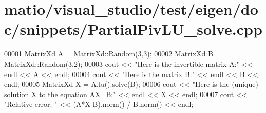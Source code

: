 \hypertarget{matio_2visual__studio_2test_2eigen_2doc_2snippets_2_partial_piv_l_u__solve_8cpp_source}{}\section{matio/visual\+\_\+studio/test/eigen/doc/snippets/\+Partial\+Piv\+L\+U\+\_\+solve.cpp}
\label{matio_2visual__studio_2test_2eigen_2doc_2snippets_2_partial_piv_l_u__solve_8cpp_source}

\begin{DoxyCode}
00001 MatrixXd A = MatrixXd::Random(3,3);
00002 MatrixXd B = MatrixXd::Random(3,2);
00003 cout << \textcolor{stringliteral}{"Here is the invertible matrix A:"} << endl << A << endl;
00004 cout << \textcolor{stringliteral}{"Here is the matrix B:"} << endl << B << endl;
00005 MatrixXd X = A.lu().solve(B);
00006 cout << \textcolor{stringliteral}{"Here is the (unique) solution X to the equation AX=B:"} << endl << X << endl;
00007 cout << \textcolor{stringliteral}{"Relative error: "} << (A*X-B).norm() / B.norm() << endl;
\end{DoxyCode}
